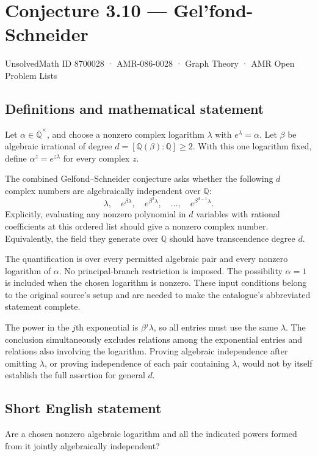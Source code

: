 \documentclass[11pt,a4paper]{article}
\begin{document}
\section*{Conjecture 3.10 — Gel’fond-Schneider}\label{8700028}
{\small UnsolvedMath ID 8700028 · AMR-086-0028 · Graph Theory · AMR Open Problem Lists}
\subsection{Definitions and mathematical statement}
Let $\alpha\in\overline{\mathbb Q}^{\times}$, and choose a nonzero complex logarithm $\lambda$ with $e^\lambda=\alpha$. Let $\beta$ be algebraic irrational of degree $d=[\mathbb Q(\beta):\mathbb Q]\ge2$. With this one logarithm fixed, define $\alpha^z=e^{z\lambda}$ for every complex $z$.

The combined Gelfond--Schneider conjecture asks whether the following $d$ complex numbers are algebraically independent over $\mathbb Q$:
\[
\lambda,\quad e^{\beta\lambda},\quad e^{\beta^2\lambda},
\quad\ldots,\quad e^{\beta^{d-1}\lambda}.
\]
Explicitly, evaluating any nonzero polynomial in $d$ variables with rational coefficients at this ordered list should give a nonzero complex number. Equivalently, the field they generate over $\mathbb Q$ should have transcendence degree $d$.

The quantification is over every permitted algebraic pair and every nonzero logarithm of $\alpha$. No principal-branch restriction is imposed. The possibility $\alpha=1$ is included when the chosen logarithm is nonzero. These input conditions belong to the original source's setup and are needed to make the catalogue's abbreviated statement complete.

The power in the $j$th exponential is $\beta^j\lambda$, so all entries must use the same $\lambda$. The conclusion simultaneously excludes relations among the exponential entries and relations also involving the logarithm. Proving algebraic independence after omitting $\lambda$, or proving independence of each pair containing $\lambda$, would not by itself establish the full assertion for general $d$.
\subsection{Short English statement}
Are a chosen nonzero algebraic logarithm and all the indicated powers formed from it jointly algebraically independent?
\end{document}
